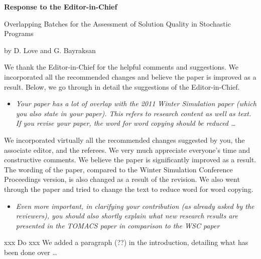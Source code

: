 \documentclass[11pt,notitlepage,onecolumn]{article}
\begin{document}

\singlespacing

\baselineskip0.26in


\pagebreak

\begin{center}
\textbf{\Large Response to the Editor-in-Chief} \medskip

{\large Overlapping Batches for the Assessment of Solution Quality in Stochastic Programs} \medskip

{\footnotesize by D. Love and G. Bayraksan}
\end{center}

\bigskip



We thank the Editor-in-Chief for the helpful comments and suggestions. 
We incorporated all the recommended changes and believe the paper is improved as a result. 
Below, we go through in detail the suggestions of the Editor-in-Chief.\medskip


\begin{itemize}
\item[] \textit{Your paper has a lot of overlap with the 2011 Winter Simulation paper  (which you also state in your paper). 
This refers to research content as well as text. 
If you revise your paper, the word for word copying should be reduced \ldots}
\end{itemize}

\noindent  
We incorporated virtually all the recommended changes suggested by you, the associate editor, and the referees. 
We very much appreciate everyone's time and constructive comments. 
We believe the paper is significantly improved as a result. 
The wording of the paper, compared to the Winter Simulation Conference Proceedings version, is also changed as a result of the revision.
We also went through the paper and tried to change the text to reduce word for word copying. 
\medskip 

\begin{itemize}
\item[]\textit{Even more important, in clarifying your contribution (as already asked by the reviewers), you should also shortly explain what new research results are presented in the  TOMACS paper in comparison to the WSC paper}
\end{itemize}

\noindent
xxx Do xxx  We added a paragraph (??) in the introduction, detailing what has been done over \ldots
\end{document}
